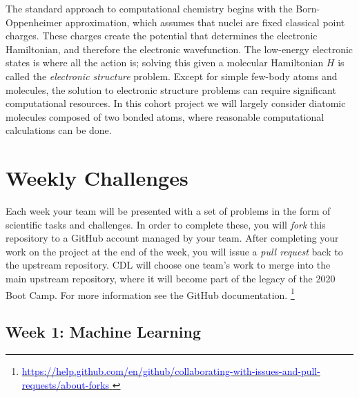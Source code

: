 \documentclass[12pt]{article}
\begin{document}
The standard approach to computational chemistry begins with the Born-Oppenheimer approximation, which assumes that nuclei are fixed classical point charges. These charges create the potential that determines the electronic Hamiltonian, and therefore the electronic wavefunction.  
The low-energy electronic states is where all the action is; solving this given a molecular Hamiltonian $H$ is
called the {\it electronic structure} problem.
Except for simple few-body atoms and molecules, the solution to electronic structure problems can require significant computational resources.  In this cohort project we will largely consider diatomic molecules composed of two bonded atoms, where reasonable computational calculations can be done.

\newpage

\section{Weekly Challenges}

Each week your team will be presented with a set of problems in the form of scientific tasks and challenges.  In order to complete these, you will {\it fork} this repository to a GitHub account managed by your team.  After completing your work on the project at the end of the week, you will issue a {\it pull request} back to the upstream repository.
CDL will choose one team's work to merge into the main upstream repository, where it will become part of the legacy of the 2020 Boot Camp.  For more information see the
GitHub documentation.
\footnote{
\href{https://help.github.com/en/github/collaborating-with-issues-and-pull-requests/about-forks}{\textcolor{blue}{https://help.github.com/en/github/collaborating-with-issues-and-pull-requests/about-forks} } }

\subsection{Week 1: Machine Learning}
\end{document}
